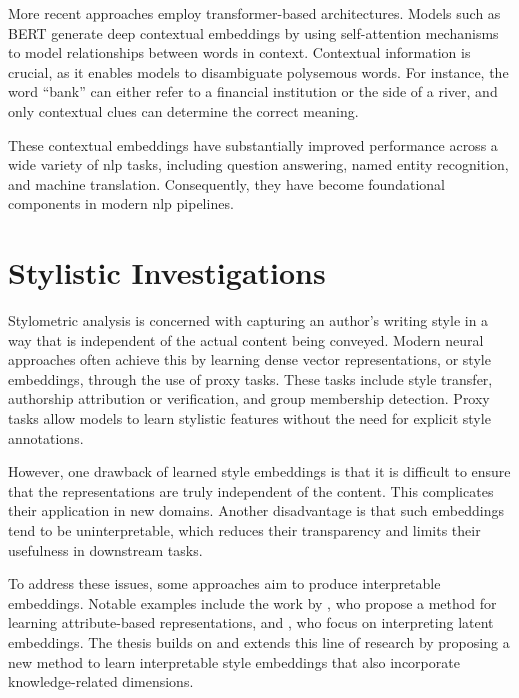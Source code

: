 More recent approaches employ transformer-based architectures. Models such as BERT \cite{devlin-etal-2019-bert} generate deep contextual embeddings by using self-attention mechanisms to model relationships between words in context. Contextual information is crucial, as it enables models to disambiguate polysemous words. For instance, the word \enquote{bank} can either refer to a financial institution or the side of a river, and only contextual clues can determine the correct meaning.

These contextual embeddings have substantially improved performance across a wide variety of \ac{nlp} tasks, including question answering, named entity recognition, and machine translation. Consequently, they have become foundational components in modern \ac{nlp} pipelines.

\section{Stylistic Investigations}
\label{sec:background:styleInvestigations}
Stylometric analysis is concerned with capturing an author's writing style in a way that is independent of the actual content being conveyed. Modern neural approaches often achieve this by learning dense vector representations, or style embeddings, through the use of proxy tasks. These tasks include style transfer, authorship attribution or verification, and group membership detection. Proxy tasks allow models to learn stylistic features without the need for explicit style annotations.

However, one drawback of learned style embeddings is that it is difficult to ensure that the representations are truly independent of the content. %
This complicates their application in new domains. Another disadvantage is that such embeddings tend to be uninterpretable, which reduces their transparency and limits their usefulness in downstream tasks.

To address these issues, some approaches aim to produce interpretable embeddings. Notable examples include the work by \citet{patelLearningInterpretableStyle2023}, who propose a method for learning attribute-based representations, and \citet{alshomaryLatentSpaceInterpretation2024}, who focus on interpreting latent embeddings. The thesis builds on and extends this line of research by proposing a new method to learn interpretable style embeddings that also incorporate knowledge-related dimensions.

